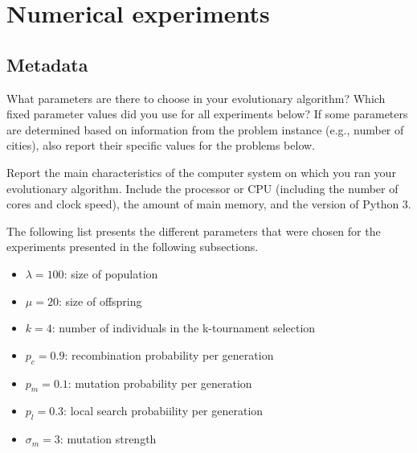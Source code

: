 \documentclass[a4paper,10pt]{article}
\newcommand{\ReplaceMe}[1]{{\color{blue}#1}}
\newcommand{\RemoveMe}[1]{{\color{purple}#1}}
\begin{document}



\section{Numerical experiments}


\subsection{Metadata}

\ReplaceMe{What parameters are there to choose in your evolutionary algorithm? Which fixed parameter values did you use for all experiments below? If some parameters are determined based on information from the problem instance (e.g., number of cities), also report their specific values for the problems below.

Report the main characteristics of the computer system on which you ran your evolutionary algorithm. Include the processor or CPU (including the number of cores and clock speed), the amount of main memory, and the version of Python 3.}

The following list presents the different parameters that were chosen for the experiments presented in the following subsections. 
\begin{itemize}
\item $\lambda = 100$: size of population
\item $\mu = 20$: size of offspring
\item $k = 4$: number of individuals in the k-tournament selection
\item $p_c = 0.9$: recombination probability per generation
\item $p_m = 0.1$: mutation probability per generation
\item $p_l = 0.3$: local search probabiility per generation
\item $\sigma_m = 3$: mutation strength
\end{itemize}
\end{document}
